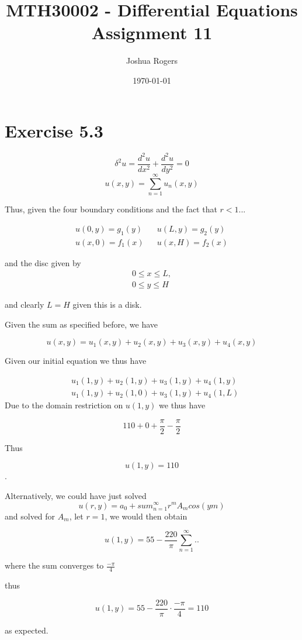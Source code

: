 \documentclass{article}
\title{\vspace{-4cm}MTH30002 - Differential Equations Assignment 11}
\author{Joshua Rogers}
\date\today
\begin{document}
\maketitle

\section*{Exercise 5.3}

$$\delta^2u = \frac{d^2u}{dx^2} + \frac{d^2u}{dy^2} = 0$$
$$u(x,y) = \sum_{n=1}^{\infty} u_n(x,y)$$


Thus, given the four boundary conditions and the fact that $r<1$...

\begin{align*}
u(0,y) = g_1(y) && u(L,y) = g_2(y)\\
u(x,0) = f_1(x) && u(x,H) = f_2(x)
\end{align*}

and the disc given by
\begin{align*}
0\leq x \leq L,\\
0 \leq y \leq H
\end{align*}

and clearly $L=H$ given this is a disk.


Given the sum as specified before, we have 

$$u(x,y) = u_1(x,y) + u_2(x,y) + u_3(x,y) + u_4(x,y)$$

Given our initial equation we thus have

\begin{align*}
&u_1(1,y) + u_2(1,y) + u_3(1,y) + u_4(1,y) \\
&u_1(1,y) + u_2(1,0) + u_3(1,y) + u_4(1,L)
\end{align*}
Due to the domain restriction on $u(1,y)$ we thus have

$$110 + 0 + \frac{\pi}{2} - \frac{\pi}{2}$$

Thus

$$u(1,y) = 110$$.


Alternatively, we could have just solved
$$u(r,y) = a_0 + sum_{n=1}^{\infty} r^m A_m cos\left(ym\right)$$
and solved for $A_m$, let $r=1$, we would then obtain

$$u(1,y) = 55 - \frac{220}{\pi} \sum_{n=1}^{\infty} ..$$

where the sum converges to $\frac{-\pi}{4}$

thus

$$u(1,y) = 55 - \frac{220}{\pi} \cdot \frac{-\pi}{4} = 110$$

as expected.
\end{document}
